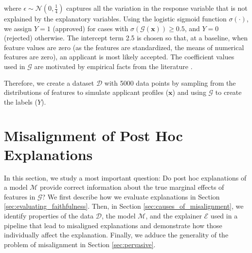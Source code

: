 \documentclass[12pt]{article}  %
\newcommand{\mD}{\mathcal{D}}
\newcommand{\mM}{\mathcal{M}}
\newcommand{\mE}{\mathcal{E}}
\begin{document}
  \noindent where $\epsilon \sim \mathcal{N}(0,\frac{1}{4})$ captures all the variation in the response variable that is not explained by the explanatory variables.
  Using the logistic sigmoid function $\sigma(\cdot)$, we assign $Y = 1$ (approved) for cases with $\sigma(\mathcal{G}(\mathbf{x}))\geq 0.5$, and $Y = 0$ (rejected) otherwise. The intercept term 2.5 is chosen so that, at a baseline, when feature values are zero (as the features are standardized, the means of numerical features are zero), an applicant is most likely accepted. %
  The coefficient values used in $\mathcal{G}$ are motivated by empirical facts from the literature \cite{cfb_age, Calcagnini2014}. %

  Therefore, we create a dataset $\mathcal{D}$ with 5000 data points by sampling from the distributions of features to simulate applicant profiles ($\mathbf{x}$) and using $\mathcal{G}$ to create the labels ($Y$). 

\vspace{-3mm}
\section{Misalignment of Post Hoc Explanations}
  \label{sec:misalignment}\vspace{-3mm}
  In this section, we study a most important question: Do post hoc explanations of a model $\mathcal{M}$ provide correct information about the true marginal effects of features in $\mathcal{G}$? We first describe how we evaluate explanations in Section \ref{sec:evaluating_faithfulness}. 
  Then, in Section \ref{sec:causes_of_misalignment}, we identify properties of the data $\mD$, the model $\mM$, and the explainer $\mE$ used in a pipeline that lead to misaligned explanations and demonstrate how those individually affect the explanation. Finally, we adduce the generality of the problem of misalignment in Section \ref{sec:pervasive}. %
\end{document}
